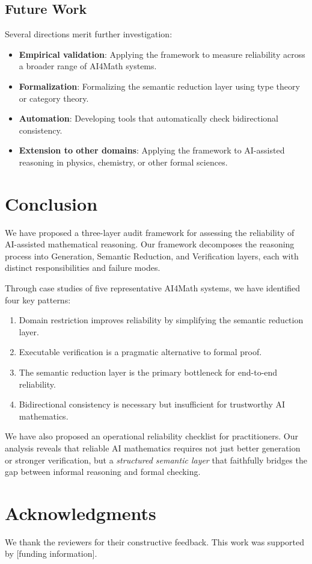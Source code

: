 \documentclass[11pt,a4paper]{article}
\begin{document}
\subsection{Future Work}

Several directions merit further investigation:
\begin{itemize}
  \item \textbf{Empirical validation}: Applying the framework to measure reliability across a broader range of AI4Math systems.
  \item \textbf{Formalization}: Formalizing the semantic reduction layer using type theory or category theory.
  \item \textbf{Automation}: Developing tools that automatically check bidirectional consistency.
  \item \textbf{Extension to other domains}: Applying the framework to AI-assisted reasoning in physics, chemistry, or other formal sciences.
\end{itemize}

\section{Conclusion}
\label{sec:conclusion}

We have proposed a three-layer audit framework for assessing the reliability of AI-assisted mathematical reasoning. Our framework decomposes the reasoning process into Generation, Semantic Reduction, and Verification layers, each with distinct responsibilities and failure modes.

Through case studies of five representative AI4Math systems, we have identified four key patterns:
\begin{enumerate}
  \item Domain restriction improves reliability by simplifying the semantic reduction layer.
  \item Executable verification is a pragmatic alternative to formal proof.
  \item The semantic reduction layer is the primary bottleneck for end-to-end reliability.
  \item Bidirectional consistency is necessary but insufficient for trustworthy AI mathematics.
\end{enumerate}

We have also proposed an operational reliability checklist for practitioners. Our analysis reveals that reliable AI mathematics requires not just better generation or stronger verification, but a \emph{structured semantic layer} that faithfully bridges the gap between informal reasoning and formal checking.

\section*{Acknowledgments}

We thank the reviewers for their constructive feedback. This work was supported by [funding information].



\end{document}
